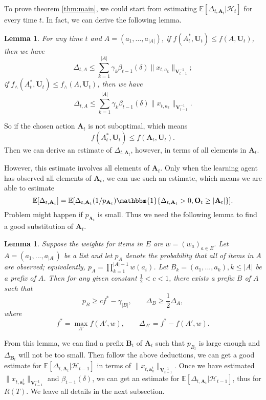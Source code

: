 \documentclass{article}
\newcommand{\EE}{\mathbb{E}}
\newcommand{\bOne}{\mathbbm{1}}
\newcommand{\bA}{\mathbf{A}}
\newcommand{\ba}{\mathbf{a}}
\newcommand{\bB}{\mathbf{B}}
\newcommand{\bO}{\mathbf{O}}
\newcommand{\bU}{\mathbf{U}}
\newcommand{\bV}{\mathbf{V}}
\newcommand{\cH}{\mathcal{H}}
\newcommand{\abs}[1]{\left| #1 \right|}
\newcommand{\norm}[1]{\| #1 \|}
\newtheorem{lemma}[theorem]{Lemma}%
\begin{document}
To prove theorem \ref{thm:main}, we could start from estimating $\EE[\Delta_{t, \bA_t}|\cH_t]$ for every time $t$. In fact, we can derive the following lemma.
\begin{lemma}
\label{lem:DeltaEstimate}
For any time $t$ and $A = (a_1, \ldots, a_{\abs{A}})$, if $f(A_t^*, \bU_t) \leq f(A, \bU_t)$, then we have
$$
\Delta_{t,A} \leq \sum_{k=1}^{\abs{A}} \gamma_k \beta_{t-1}(\delta)\norm{x_{t,a_k}}_{\bV_{t-1}^{-1}};
$$
if $f_{\wedge}(A_t^*, \bU_t) \leq f_{\wedge}(A, \bU_t)$, then we have
$$
\Delta_{t,A} \leq \sum_{k=1}^{\abs{A}} \gamma_k \beta_{t-1}(\delta)\norm{x_{t,a_k}}_{\bV_{t-1}^{-1}}.
$$
\end{lemma}

So if the chosen action $\bA_t$ is not suboptimal, which means
$$
f(A_t^*, \bU_t) \leq f(\bA_t, \bU_t).
$$
Then we can derive an estimate of $\Delta_{t, \bA_t}$, however, in terms of all elements in $\bA_t$. 

However, this estimate involves all elements of $\bA_t$. Only when the learning agent has observed all elements of $\bA_t$, we can use such an estimate, which means we are able to estimate
$$
\EE[\Delta_{t, \bA_t}] = \EE[\Delta_{t, \bA_t}(1/p_{\bA_t}) \bOne\{\Delta_{t, \bA_t} > 0, \bO_t \geq \abs{\bA_t}\}].
$$
Problem might happen if $p_{\bA_t}$ is small. Thus we need the following lemma to find a good substitution of $\bA_t$.

\begin{lemma}
\label{lem:prefixExist}
Suppose the weights for items in $E$ are $w = (w_a)_{a \in E}$. Let $A = (a_1, ..., a_{\abs{A}})$ be a list and let $p_A$ denote the probability that all of items in $A$ are observed; equivalently, $p_A = \prod_{k=1}^{\abs{A}-1}w(a_i)$. Let $B_k = (a_1, ..., a_k), k \leq \abs{A}$ be a prefix of $A$. Then for any given constant $\frac{1}{2} < c < 1$, there exists a prefix $B$ of $A$ such that
$$
p_B \geq c f^* - \gamma_{\abs{B}}, \qquad \Delta_B \geq \frac{1}{2} \Delta_A,
$$
where
$$
f^* = \max_{A'} f(A', w), \qquad \Delta_{A'} = f^* - f(A', w).
$$
\end{lemma}

From this lemma, we can find a prefix $\bB_t$ of $\bA_t$ such that $p_{B_t}$ is large enough and $\Delta_{\bB_t}$ will not be too small. Then follow the above deductions, we can get a good estimate for $\EE[\Delta_{t, \bA_t}|\cH_{t-1}]$ in terms of $\norm{x_{t,\ba_k^t}}_{\bV_{t-1}^{-1}}$. Once we have estimated $\norm{x_{t,\ba_k^t}}_{\bV_{t-1}^{-1}}$ and $\beta_{t-1}(\delta)$, we can get an estimate for $\EE[\Delta_{t, \bA_t}|\cH_{t-1}]$, thus for $R(T)$. We leave all details in the next subsection.
\end{document}
